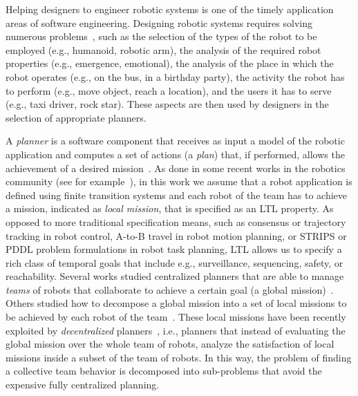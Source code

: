 Helping designers to engineer robotic systems is one of the timely application areas of software engineering. 
Designing %
robotic systems requires solving %
numerous problems~\cite{ljungblad2005designing}, such as the selection of the types of the robot to be employed (e.g., humanoid, robotic arm), the analysis of the required robot properties (e.g., emergence, emotional), the analysis of the place in which the robot operates (e.g., on the bus, in a birthday party), the activity the robot has to perform (e.g., move object, reach a location), and the users it has to serve (e.g., taxi driver, rock star). 
These aspects are then used by designers in the selection of appropriate planners.

A \emph{planner} is  a software component that receives as input a model of the robotic application and computes  a set of actions (a \emph{plan}) that, if performed, allows the achievement of a desired mission~\cite{latombe2012robot}.
As done in some recent works in the robotics community (see for example~\cite{fainekos2005temporal,kress2007s,kloetzer2008fully,fainekos2009temporal,wongpiromsarn2010receding,bhatia2010sampling,bhatia2010motion}), in this work we assume that 
a robot application is defined using finite transition systems and
each robot of the team  has to achieve a mission,  indicated as \emph{local mission}, that is specified as an LTL property. 
As opposed to more traditional specification means, such as consensus or trajectory tracking in robot control, A-to-B travel in robot motion planning, or STRIPS or PDDL problem formulations in robot task planning, LTL allows us to specify a rich class of temporal goals that include e.g., surveillance, sequencing, safety, or reachability.
Several works studied centralized planners that are able to manage \emph{teams} of robots that collaborate to achieve a certain goal (a global mission)~\cite{kloetzer2011multi,loizou2005automated,quottrup2004multi}.
Others studied how to decompose a global mission into a set of local missions to be achieved by each robot of the team~\cite{schillinger2016decomposition,guo2015multi,guo2015multi,tumova2016multi}. 
These local missions have been recently exploited by \emph{decentralized} planners~\cite{tumova2016multi}, i.e., planners that instead of evaluating the global mission over the whole team of robots, analyze the satisfaction of local missions inside a subset of the team of robots. 
In this way, the problem of finding a collective team behavior is decomposed into sub-problems that avoid the expensive fully centralized planning.

